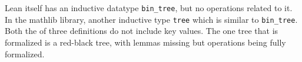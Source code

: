 Lean itself has an inductive datatype \lstinline{bin_tree}, but no operations related to it. In the mathlib library, another inductive type \lstinline{tree} which is similar to \lstinline{bin_tree}. Both the of three definitions do not include key values. The one tree that is formalized is a red-black tree, with lemmas missing but operations being fully formalized. 